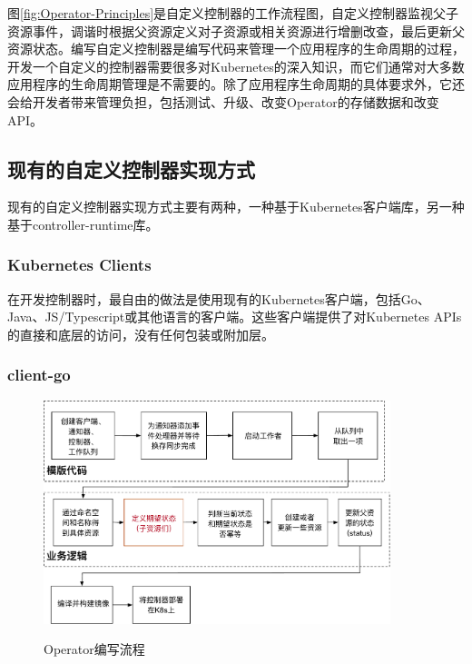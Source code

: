 \documentclass[macfonts,master]{njuthesis}
\begin{document}
图\ref{fig:Operator-Principles}是自定义控制器的工作流程图，自定义控制器监视父子资源事件，调谐时根据父资源定义对子资源或相关资源进行增删改查，最后更新父资源状态。编写自定义控制器是编写代码来管理一个应用程序的生命周期的过程，开发一个自定义的控制器需要很多对Kubernetes的深入知识，而它们通常对大多数应用程序的生命周期管理是不需要的。除了应用程序生命周期的具体要求外，它还会给开发者带来管理负担，包括测试、升级、改变Operator的存储数据和改变API\cite{kudovscc}。

\subsection{现有的自定义控制器实现方式}

现有的自定义控制器实现方式主要有两种，一种基于Kubernetes客户端库，另一种基于controller-runtime库。

\subsubsection{Kubernetes Clients}

在开发控制器时，最自由的做法是使用现有的Kubernetes客户端，包括Go、Java、JS/Typescript或其他语言的客户端。这些客户端提供了对Kubernetes APIs的直接和底层的访问，没有任何包装或附加层。

\subsubsection{client-go}


\begin{figure}[htbp]
  \centering
  \includegraphics[width=0.9\textwidth]{pics/coding-operator.pdf}\\
  \caption{Operator编写流程}\label{fig:coding-operator}
\end{figure}
\end{document}

